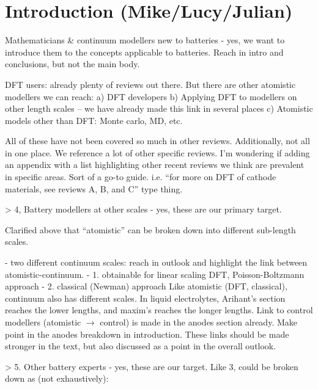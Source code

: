 \documentclass[../main.tex]{subfiles}
\begin{document}
\section{Introduction (Mike/Lucy/Julian)}
\label{sec:intro}


Mathematicians \& continuum modellers new to batteries - yes, we want to introduce them to the concepts applicable to batteries. Reach in intro and conclusions, but not the main body.

DFT users: already plenty of reviews out there. But there are other atomistic modellers we can reach:
a) DFT developers
b) Applying DFT to modellers on other length scales – we have already made this link in several places
c) Atomistic models other than DFT: Monte carlo, MD, etc.

All of these have not been covered so much in other reviews.
Additionally, not all in one place. We reference a lot of other specific reviews. I’m wondering if adding an appendix with a list highlighting other recent reviews we think are prevalent in specific areas. Sort of a go-to guide. i.e.  “for more on DFT of cathode materials, see reviews A, B, and C” type thing.

> 4, Battery modellers at other scales - yes, these are our primary target. 

Clarified above that “atomistic” can be broken down into different sub-length scales.

- two different continuum scales: reach in outlook and highlight the link between atomistic-continuum.
- 1. obtainable for linear scaling DFT, Poisson-Boltzmann approach
- 2. classical (Newman) approach
Like atomistic (DFT, classical), continuum also has different scales. In liquid electrolytes, Arihant’s section reaches the lower lengths, and maxim’s reaches the longer lengths.
Link to control modellers (atomistic $\to$ control) is made in the anodes section already. Make point in the anodes breakdown in introduction.
These links should be made stronger in the text, but also discussed as a point in the overall outlook.

> 5. Other battery experts - yes, these are our target. Like 3, could be broken down as (not exhaustively):
\end{document}
